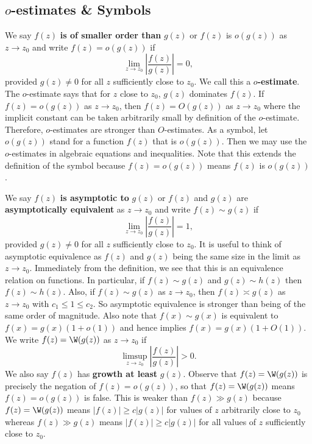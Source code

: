       \subsection*{\texorpdfstring{$o$}{o}-estimates \& Symbols}
        We say $f(z)$ \textbf{is of smaller order than} $g(z)$ or $f(z)$ is $o(g(z))$ as $z \to z_{0}$ and write $f(z) = o(g(z))$ if
        \[
          \lim_{z \to z_{0}}\left|\frac{f(z)}{g(z)}\right| = 0,
        \]
        provided $g(z) \neq 0$ for all $z$ sufficiently close to $z_{0}$. We call this a \textbf{$o$-estimate}. The $o$-estimate says that for $z$ close to $z_{0}$, $g(z)$ dominates $f(z)$. If $f(z) = o(g(z))$ as $z \to z_{0}$, then $f(z) = O(g(z))$ as $z \to z_{0}$ where the implicit constant can be taken arbitrarily small by definition of the $o$-estimate. Therefore, $o$-estimates are stronger than $O$-estimates. As a symbol, let $o(g(z))$ stand for a function $f(z)$ that is $o(g(z))$. Then we may use the $o$-estimates in algebraic equations and inequalities. Note that this extends the definition of the symbol because $f(z) = o(g(z))$ means $f(z)$ is $o(g(z))$.

        We say $f(z)$ \textbf{is asymptotic to} $g(z)$ or $f(z)$ and $g(z)$ are \textbf{asymptotically equivalent} as $z \to z_{0}$ and write $f(z) \sim g(z)$ if
        \[
          \lim_{z \to z_{0}}\left|\frac{f(z)}{g(z)}\right| = 1,
        \]
        provided $g(z) \neq 0$ for all $z$ sufficiently close to $z_{0}$. It is useful to think of asymptotic equivalence as $f(z)$ and $g(z)$ being the same size in the limit as $z \to z_{0}$. Immediately from the definition, we see that this is an equivalence relation on functions. In particular, if $f(z) \sim g(z)$ and $g(z) \sim h(z)$ then $f(z) \sim h(z)$. Also, if $f(z) \sim g(z)$ as $z \to z_{0}$, then $f(z) \asymp g(z)$ as $z \to z_{0}$ with $c_{1} \le 1 \le c_{2}$. So asymptotic equivalence is stronger than being of the same order of magnitude. Also note that $f(x) \sim g(x)$ is equivalent to $f(x) = g(x)(1+o(1))$ and hence implies $f(x) = g(x)(1+O(1))$. We write $f(z) = \W(g(z))$ as $z \to z_{0}$ if
        \[
          \limsup_{z \to z_{0}}\left|\frac{f(z)}{g(z)}\right| > 0.
        \]
        We also say $f(z)$ has \textbf{growth at least} $g(z)$. Observe that $f(z) = \W(g(z))$ is precisely the negation of $f(z) = o(g(z))$, so that $f(z) = \W(g(z))$ means $f(z) = o(g(z))$ is false. This is weaker than $f(z) \gg g(z)$ because $f(z) = \W(g(z))$ means $|f(z)| \ge c|g(z)|$ for values of $z$ arbitrarily close to $z_{0}$ whereas $f(z) \gg g(z)$ means $|f(z)| \ge c|g(z)|$ for all values of $z$ sufficiently close to $z_{0}$.
